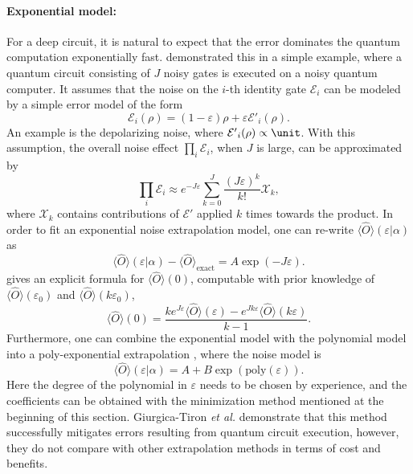\paragraph{Exponential model:} \label{sec:mit-exp-model}
For a deep circuit, it is natural to expect that the error dominates the quantum computation exponentially fast.
\citet{endoPracticalQuantumError2018} demonstrated this in a simple example,
where a quantum circuit consisting of $J$ noisy gates is executed on a noisy quantum computer. It assumes that the noise
on the $i$-th identity gate $\mathcal{E}_i$ can be modeled by a simple error model of the form
\begin{equation}
    \mathcal{E}_i(\rho) = (1-\varepsilon) \rho + \varepsilon \mathcal{\mathcal{E}'}_{i} (\rho).
\end{equation}
An example is the depolarizing noise, where $\mathcal{E'}_i(\rho) \propto \unit$. With this assumption,
the overall noise effect $\prod_i \mathcal{E}_i$, when $J$ is large, can be approximated by
\begin{equation}
    \prod_i \mathcal{E}_i \approx e^{-J\varepsilon}  \sum_{k=0}^{J} \frac{(J\varepsilon)^k}{k!} \mathcal{X}_k,
\end{equation}
where $\mathcal{X}_k$ contains contributions of $\mathcal{E'}$ applied $k$ times towards the product. In order to fit an exponential noise extrapolation model, one can re-write $\langle \hat{O} \rangle( \varepsilon |\alpha )$ as
\begin{equation}
    \label{eq:mit-exp-1}
    \langle \hat{O} \rangle( \varepsilon |\alpha ) -\langle \hat{O} \rangle_{\mathrm{exact}} =A\exp( -J \varepsilon ).
\end{equation}
\citet{endoPracticalQuantumError2018} gives an explicit formula for $\langle \hat{O} \rangle( 0)$, computable with prior knowledge of $\langle \hat{O} \rangle( \varepsilon _{0})$ and $\langle \hat{O} \rangle( k\varepsilon _{0})$,
\begin{equation}
    \label{eq:mit-exp-2}
    \langle \hat{O} \rangle(0) = \frac{k e^{J \varepsilon}\langle \hat{O}\rangle(\varepsilon)-e^{J k \varepsilon}\langle \hat{O}\rangle(k \varepsilon)}{k-1}.
\end{equation}
Furthermore, one can combine the exponential model with the polynomial model into a poly-exponential extrapolation \cite{giurgica-tironDigitalZeroNoise2020}, where the noise model is
\begin{equation}
    \langle \hat{O} \rangle( \varepsilon |\alpha ) = A + B \exp(\mathrm{poly}(\varepsilon)).
\end{equation}
Here the degree of the polynomial in $\varepsilon$ needs to be chosen by experience, and the coefficients can be obtained with the minimization method mentioned at the beginning of this section. Giurgica-Tiron \textit{et al.} \cite{giurgica-tironDigitalZeroNoise2020} demonstrate that this method successfully mitigates errors resulting from quantum circuit execution, however, they do not compare with other extrapolation methods in terms of cost and benefits. 

